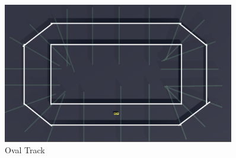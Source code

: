 \begin{figure}[H]
    \centering
    \includegraphics[width=0.90\textwidth]{images/tracks/OvalTrack.png}
    \caption{ Oval Track}
    \label{fig:ovaltrack}
\end{figure}
